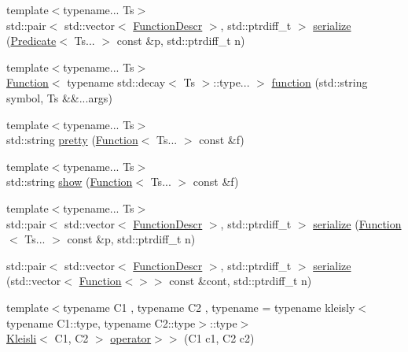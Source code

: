 \begin{DoxyCompactItemize}
\item 
{\footnotesize template$<$typename... Ts$>$ }\\std\+::pair$<$ std\+::vector$<$ \hyperlink{structpfq_1_1lang_1_1FunctionDescr}{Function\+Descr} $>$, std\+::ptrdiff\+\_\+t $>$ \hyperlink{namespacepfq_1_1lang_ad631d8e32cf8613ad1f3f19f1b02cab6}{serialize} (\hyperlink{structpfq_1_1lang_1_1Predicate}{Predicate}$<$ Ts... $>$ const \&p, std\+::ptrdiff\+\_\+t n)
\item 
{\footnotesize template$<$typename... Ts$>$ }\\\hyperlink{structpfq_1_1lang_1_1Function}{Function}$<$ typename std\+::decay$<$ Ts $>$\+::type... $>$ \hyperlink{namespacepfq_1_1lang_a1a4638059d700ae08d0ca63886ff2bb3}{function} (std\+::string symbol, Ts \&\&...args)
\item 
{\footnotesize template$<$typename... Ts$>$ }\\std\+::string \hyperlink{namespacepfq_1_1lang_ae99e641e0f2d5461ed2c09ce92a82156}{pretty} (\hyperlink{structpfq_1_1lang_1_1Function}{Function}$<$ Ts... $>$ const \&f)
\item 
{\footnotesize template$<$typename... Ts$>$ }\\std\+::string \hyperlink{namespacepfq_1_1lang_adb5a6dd5a3af8c170720c866a7839daa}{show} (\hyperlink{structpfq_1_1lang_1_1Function}{Function}$<$ Ts... $>$ const \&f)
\item 
{\footnotesize template$<$typename... Ts$>$ }\\std\+::pair$<$ std\+::vector$<$ \hyperlink{structpfq_1_1lang_1_1FunctionDescr}{Function\+Descr} $>$, std\+::ptrdiff\+\_\+t $>$ \hyperlink{namespacepfq_1_1lang_a91564354df60bcd58020fbe47e1a7b2a}{serialize} (\hyperlink{structpfq_1_1lang_1_1Function}{Function}$<$ Ts... $>$ const \&p, std\+::ptrdiff\+\_\+t n)
\item 
std\+::pair$<$ std\+::vector$<$ \hyperlink{structpfq_1_1lang_1_1FunctionDescr}{Function\+Descr} $>$, std\+::ptrdiff\+\_\+t $>$ \hyperlink{namespacepfq_1_1lang_aa88658cb028dffc2e03a0fe2e8304bec}{serialize} (std\+::vector$<$ \hyperlink{structpfq_1_1lang_1_1Function}{Function}$<$$>$$>$ const \&cont, std\+::ptrdiff\+\_\+t n)
\item 
{\footnotesize template$<$typename C1 , typename C2 , typename  = typename kleisly$<$typename C1\+::type, typename C2\+::type$>$\+::type$>$ }\\\hyperlink{structpfq_1_1lang_1_1Kleisli}{Kleisli}$<$ C1, C2 $>$ \hyperlink{namespacepfq_1_1lang_a7572c906145bed1281a8c4ce8c8eff79}{operator$>$$>$} (C1 c1, C2 c2)
\item 

\end{DoxyCompactItemize}
